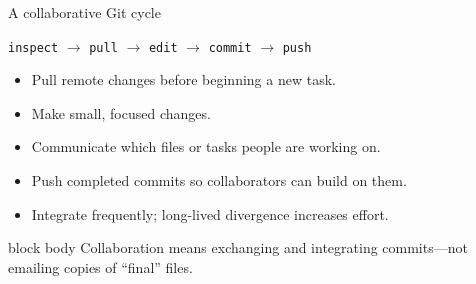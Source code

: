 \documentclass[10pt,aspectratio=169]{beamer}
\begin{document}
\begin{frame}{A collaborative Git cycle}

\small

\centering
\Large
\texttt{inspect} $\rightarrow$ \texttt{pull} $\rightarrow$ \texttt{edit}
$\rightarrow$ \texttt{commit} $\rightarrow$ \texttt{push}

\vspace{0.25cm}

\normalsize
\raggedright

\begin{itemize}
  \item Pull remote changes before beginning a new task.
  \item Make small, focused changes.
  \item Communicate which files or tasks people are working on.
  \item Push completed commits so collaborators can build on them.
  \item Integrate frequently; long-lived divergence increases effort.
\end{itemize}

\vspace{0.25cm}

\begin{beamercolorbox}[rounded=true,sep=8pt]{block body}
Collaboration means exchanging and integrating commits---not emailing copies of
``final'' files.
\end{beamercolorbox}

\end{frame}
\end{document}
